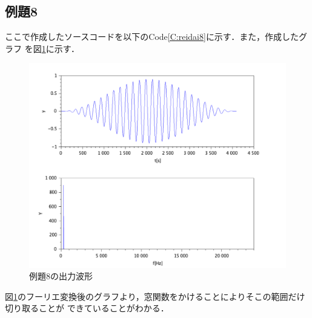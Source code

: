 \documentclass[a4paper,11pt]{jsarticle}
\begin{document}
\subsection{例題8}
ここで作成したソースコードを以下のCode\ref{C:reidai8}に示す．また，作成したグラフ
を図\ref{G:reidai8}に示す．

\begin{figure}[H]
  \centering
  \includegraphics[width=0.8\linewidth]{picture/reidai8.png}
  \caption{例題8の出力波形}
  \label{G:reidai8}
\end{figure}
図\ref{G:reidai8}のフーリエ変換後のグラフより，窓関数をかけることによりそこの範囲だけ切り取ることが
できていることがわかる．
\end{document}
